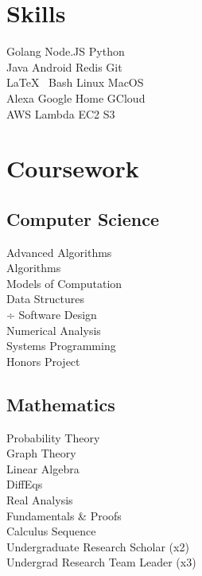 \documentclass[]{deedy-resume-openfont}
\begin{document}
\begin{minipage}[t]{0.33\textwidth}
\section{Skills}
Golang \textbullet{} Node.JS \textbullet{} Python  \\
Java \textbullet{} Android  \textbullet{} Redis \textbullet{} Git \\
\LaTeX\ \textbullet{} Bash \textbullet{} Linux \textbullet{} MacOS \\
Alexa \textbullet{} Google Home \textbullet{} GCloud \\
AWS \textbullet{} Lambda \textbullet{} EC2 \textbullet{} S3 \\
\sectionsep



\vspace{8pt}

\section{Coursework}
\subsection{Computer Science}
Advanced Algorithms \\
Algorithms \\
Models of Computation \\
Data Structures \\÷
Software Design \\
Numerical Analysis \\
Systems Programming\\
Honors Project \\
\sectionsep

\subsection{Mathematics}
Probability Theory \\
Graph Theory \\
Linear Algebra \\
DiffEqs \\
Real Analysis \\
Fundamentals \& Proofs \\
Calculus Sequence \\
Undergraduate Research Scholar (x2) \\
Undergrad Research Team Leader (x3) \\
\sectionsep



\end{minipage}
\end{document}
